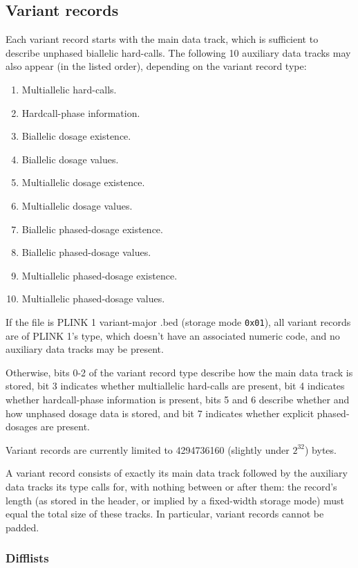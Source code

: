\documentclass[8pt]{article}
\begin{document}
\subsection{Variant records}
\label{sec:vr}

Each variant record starts with the main data track, which is sufficient to
describe unphased biallelic hard-calls.  The following 10 auxiliary data tracks
may also appear (in the listed order), depending on the variant record type:

\begin{enumerate}
\item Multiallelic hard-calls.
\item Hardcall-phase information.
\item Biallelic dosage existence.
\item Biallelic dosage values.
\item Multiallelic dosage existence.
\item Multiallelic dosage values.
\item Biallelic phased-dosage existence.
\item Biallelic phased-dosage values.
\item Multiallelic phased-dosage existence.
\item Multiallelic phased-dosage values.
\end{enumerate}

If the file is PLINK 1 variant-major .bed (storage mode \texttt{0x01}), all
variant records are of PLINK 1's type, which doesn't have an associated numeric
code, and no auxiliary data tracks may be present.

Otherwise, bits 0-2 of the variant record type describe how the main data track
is stored, bit 3 indicates whether multiallelic hard-calls are present, bit 4
indicates whether hardcall-phase information is present, bits 5 and 6 describe
whether and how unphased dosage data is stored, and bit 7 indicates whether
explicit phased-dosages are present.

Variant records are currently limited to 4294736160 (slightly under $2^{32}$)
bytes.

A variant record consists of exactly its main data track followed by the
auxiliary data tracks its type calls for, with nothing between or after them:
the record's length (as stored in the header, or implied by a fixed-width
storage mode) must equal the total size of these tracks.  In particular,
variant records cannot be padded.

\subsubsection{Difflists}
\end{document}
